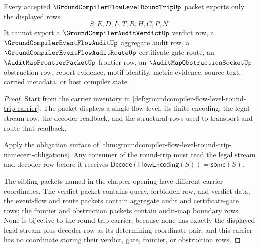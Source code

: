 \begin{theorem}
\label{thm:groundcompiler-flow-level-round-trip-nonescape}
Every accepted $\GroundCompilerFlowLevelRoundTripUp$ packet exports only the displayed rows
$$
S,E,D,L,T,R,H,C,P,N.
$$
It cannot export a $\GroundCompilerAuditVerdictUp$ verdict row, a $\GroundCompilerEventFlowAuditUp$ aggregate audit row, a $\GroundCompilerEventFlowAuditRouteUp$ certificate-gate route, an $\AuditMapFrontierPacketUp$ frontier row, an $\AuditMapObstructionSocketUp$ obstruction row, report evidence, motif identity, metric evidence, source text, carried metadata, or host compiler state.
\end{theorem}
\begin{proof}
Start from the carrier inventory in \autoref{def:groundcompiler-flow-level-round-trip-carrier}. The packet displays a single flow level, its finite encoding, the legal-stream row, the decoder readback, and the structural rows used to transport and route that readback.

Apply the obligation surface of \autoref{thm:groundcompiler-flow-level-round-trip-namecert-obligations}. Any consumer of the round-trip must read the legal stream and decoder row before it receives $\mathsf{Decode}(\mathsf{FlowEncoding}(S))=\mathsf{some}(S)$.

The sibling packets named in the chapter opening have different carrier coordinates. The verdict packet contains query, forbidden-row, and verdict data; the event-flow and route packets contain aggregate audit and certificate-gate rows; the frontier and obstruction packets contain audit-map boundary rows. None is bijective to the round-trip carrier, because none has exactly the displayed legal-stream plus decoder row as its determining coordinate pair, and this carrier has no coordinate storing their verdict, gate, frontier, or obstruction rows.
\end{proof}


